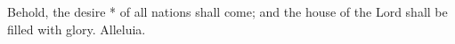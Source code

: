 Behold, the desire * of all nations shall come; and the house of the Lord shall be filled with glory. Alleluia.